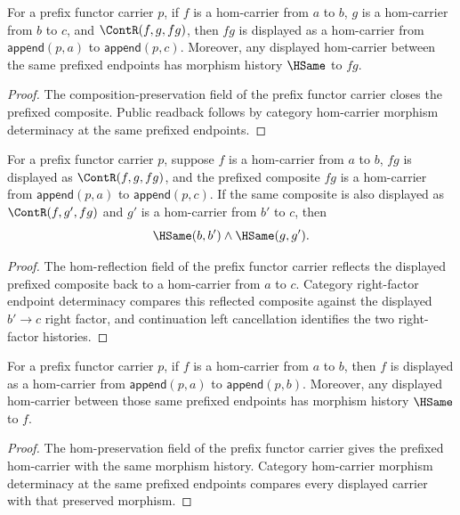 \begin{theorem}
\label{thm:prefix-functor-carrier-comp-public-readback}
For a prefix functor carrier \(p\), if \(f\) is a hom-carrier from \(a\) to
\(b\), \(g\) is a hom-carrier from \(b\) to \(c\), and
\(\ContR(f,g,fg)\), then \(fg\) is displayed as a hom-carrier from
\(\mathsf{append}(p,a)\) to \(\mathsf{append}(p,c)\). Moreover, any displayed
hom-carrier between the same prefixed endpoints has morphism history
\(\HSame\) to \(fg\).
\end{theorem}
\begin{proof}
The composition-preservation field of the prefix functor carrier closes the
prefixed composite. Public readback follows by category hom-carrier morphism
determinacy at the same prefixed endpoints.
\end{proof}

\begin{theorem}
\label{thm:prefix-functor-carrier-comp-right-factor-endpoint-deterministic}
For a prefix functor carrier \(p\), suppose \(f\) is a hom-carrier from \(a\)
to \(b\), \(fg\) is displayed as \(\ContR(f,g,fg)\), and the prefixed
composite \(fg\) is a hom-carrier from \(\mathsf{append}(p,a)\) to
\(\mathsf{append}(p,c)\). If the same composite is also displayed as
\(\ContR(f,g',fg)\) and \(g'\) is a hom-carrier from \(b'\) to \(c\), then
$$
\HSame(b,b')\wedge\HSame(g,g').
$$
\end{theorem}
\begin{proof}
The hom-reflection field of the prefix functor carrier reflects the displayed
prefixed composite back to a hom-carrier from \(a\) to \(c\). Category
right-factor endpoint determinacy compares this reflected composite against
the displayed \(b'\to c\) right factor, and continuation left cancellation
identifies the two right-factor histories.
\end{proof}

\begin{theorem}
\label{thm:prefix-functor-carrier-hom-public-readback}
For a prefix functor carrier \(p\), if \(f\) is a hom-carrier from \(a\) to
\(b\), then \(f\) is displayed as a hom-carrier from
\(\mathsf{append}(p,a)\) to \(\mathsf{append}(p,b)\). Moreover, any displayed
hom-carrier between those same prefixed endpoints has morphism history
\(\HSame\) to \(f\).
\end{theorem}
\begin{proof}
The hom-preservation field of the prefix functor carrier gives the prefixed
hom-carrier with the same morphism history. Category hom-carrier morphism
determinacy at the same prefixed endpoints compares every displayed carrier
with that preserved morphism.
\end{proof}

